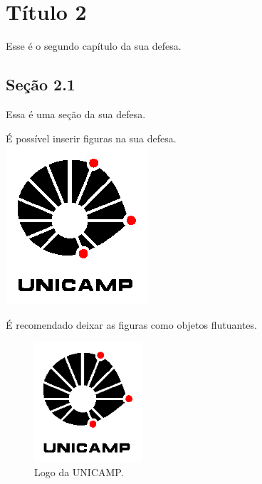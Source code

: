 \chapter{Título 2}
Esse é o segundo capítulo da sua defesa.

\section{Seção 2.1}
Essa é uma seção da sua defesa.

É possível inserir figuras na sua defesa. \\
\includegraphics{figuras/unicamp-logo.jpg}

\'E recomendado deixar as figuras como objetos flutuantes.
\begin{figure}[!htb]
    \center
    \includegraphics[width=4cm]{figuras/unicamp-logo.jpg}
    \caption{Logo da UNICAMP.}
    \label{fig:log_unicamp}
\end{figure}

